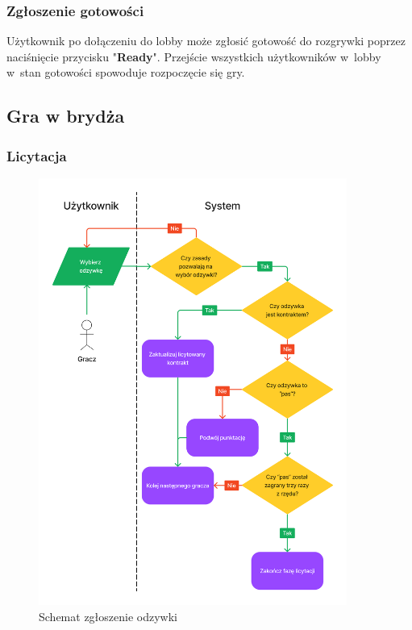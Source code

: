 \FloatBarrier


\subsubsection{Zgłoszenie gotowości}
Użytkownik po dołączeniu do lobby może zgłosić gotowość do rozgrywki poprzez
naciśnięcie przycisku "\textbf{Ready}". Przejście wszystkich użytkowników w~lobby
w~stan gotowości spowoduje rozpoczęcie się gry.


\subsection{Gra w brydża}

\subsubsection{Licytacja}

\begin{figure}[hbt!]
    \centering
    \includegraphics[width=0.9\textwidth]{img/schematy/bid.png}
    \caption{Schemat zgłoszenie odzywki}
\end{figure}


